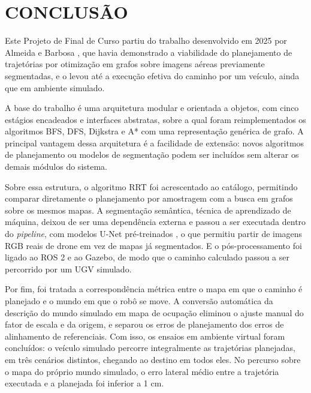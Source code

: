 \documentclass[
    12pt,
    openright,
    oneside,
    a4paper,
    english,
    brazil
]{abntex2}
\begin{document}
\chapter{CONCLUSÃO}
\label{cap:conclusao}

Este Projeto de Final de Curso partiu do trabalho desenvolvido em 2025 por Almeida e Barbosa \cite{camelo2025}, que havia demonstrado a viabilidade do planejamento de trajetórias por otimização em grafos sobre imagens aéreas previamente segmentadas, e o levou até a execução efetiva do caminho por um veículo, ainda que em ambiente simulado.

A base do trabalho é uma arquitetura modular e orientada a objetos, com cinco estágios encadeados e interfaces abstratas, sobre a qual foram reimplementados os algoritmos BFS, DFS, Dijkstra e A* com uma representação genérica de grafo. A principal vantagem dessa arquitetura é a facilidade de extensão: novos algoritmos de planejamento ou modelos de segmentação podem ser incluídos sem alterar os demais módulos do sistema.

Sobre essa estrutura, o algoritmo RRT foi acrescentado ao catálogo, permitindo comparar diretamente o planejamento por amostragem com a busca em grafos sobre os mesmos mapas. A segmentação semântica, técnica de aprendizado de máquina, deixou de ser uma dependência externa e passou a ser executada dentro do \textit{pipeline}, com modelos U-Net pré-treinados \cite{junior2024_models}, o que permitiu partir de imagens RGB reais de drone em vez de mapas já segmentados. E o pós-processamento foi ligado ao ROS 2 e ao Gazebo, de modo que o caminho calculado passou a ser percorrido por um UGV simulado.

Por fim, foi tratada a correspondência métrica entre o mapa em que o caminho é planejado e o mundo em que o robô se move. A conversão automática da descrição do mundo simulado em mapa de ocupação eliminou o ajuste manual do fator de escala e da origem, e separou os erros de planejamento dos erros de alinhamento de referenciais. Com isso, os ensaios em ambiente virtual foram concluídos: o veículo simulado percorre integralmente as trajetórias planejadas, em três cenários distintos, chegando ao destino em todos eles. No percurso sobre o mapa do próprio mundo simulado, o erro lateral médio entre a trajetória executada e a planejada foi inferior a 1 cm.
\end{document}
